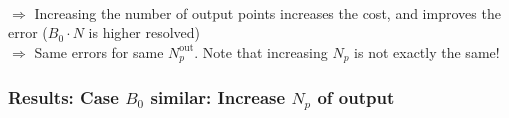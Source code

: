 \documentclass[aspectratio=169]{beamer}
\newcommand{\textc}[1]{\textcolor{iagcolor}{#1}}
\begin{document}
\begin{frame}
{  }\\
  \textc{$\Rightarrow$ Increasing the number of output points increases the cost, and improves the error   ($B_0\cdot N$ is higher resolved)}\\
  \textc{$\Rightarrow$ Same errors for same $N_p^\text{out}$. Note that increasing $N_p$ is not exactly the same!}
 

\end{frame}

\begin{frame}
 \frametitle{Results: Case $B_0$ similar: Increase $N_p$ of output}
 \centering\small
\end{frame}
\end{document}
